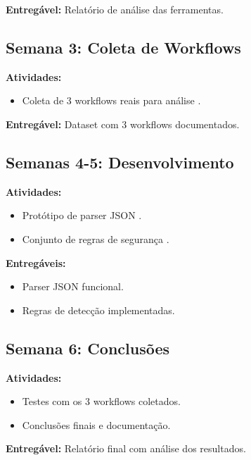 \documentclass{sftex}
\begin{document}
\textbf{Entregável:} Relatório de análise das ferramentas.

\subsection{Semana 3: Coleta de Workflows}

\textbf{Atividades:}
\begin{itemize}
  \item Coleta de 3 workflows reais para análise \cite{n8n_workflow_analysis}.
\end{itemize}

\textbf{Entregável:} Dataset com 3 workflows documentados.

\subsection{Semanas 4-5: Desenvolvimento}

\textbf{Atividades:}
\begin{itemize}
  \item Protótipo de parser JSON \cite{n8n_code_integrations}.
  \item Conjunto de regras de segurança \cite{semgrep_custom_rules}.
\end{itemize}

\textbf{Entregáveis:}
\begin{itemize}
  \item Parser JSON funcional.
  \item Regras de detecção implementadas.
\end{itemize}

\subsection{Semana 6: Conclusões}

\textbf{Atividades:}
\begin{itemize}
  \item Testes com os 3 workflows coletados.
  \item Conclusões finais e documentação.
\end{itemize}

\textbf{Entregável:} Relatório final com análise dos resultados.

\newpage



\end{document}
